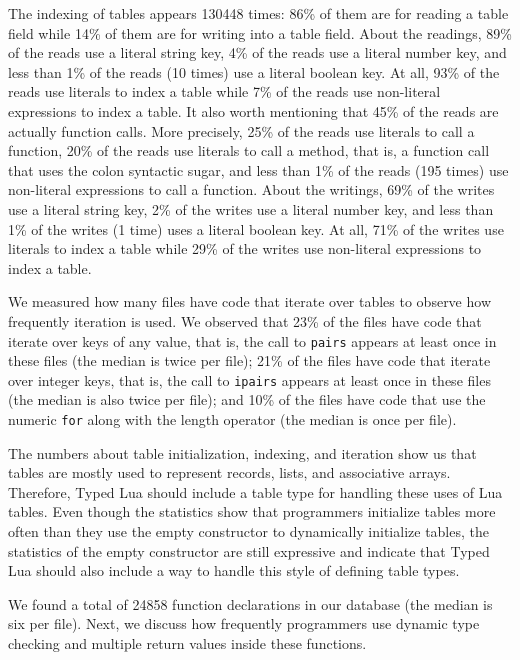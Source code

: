 \documentclass[preprint]{sig-alternate}
\begin{document}
The indexing of tables appears 130448 times:
86\% of them are for reading a table field while
14\% of them are for writing into a table field.
About the readings, 89\% of the reads use a literal string key,
4\% of the reads use a literal number key,
and less than 1\% of the reads (10 times) use a literal boolean key.
At all, 93\% of the reads use literals to index a table while
7\% of the reads use non-literal expressions to index a table.
It also worth mentioning that 45\% of the reads are actually
function calls.
More precisely, 25\% of the reads use literals to call a function,
20\% of the reads use literals to call a method, that is,
a function call that uses the colon syntactic sugar, 
and less than 1\% of the reads (195 times) use non-literal expressions
to call a function.
About the writings, 69\% of the writes use a literal string key,
2\% of the writes use a literal number key,
and less than 1\% of the writes (1 time) uses a literal boolean key.
At all, 71\% of the writes use literals to index a table while
29\% of the writes use non-literal expressions to index a table.

We measured how many files have code that iterate over tables to
observe how frequently iteration is used.
We observed that 23\% of the files have code that iterate over keys
of any value, that is, the call to \verb'pairs' appears at least once
in these files (the median is twice per file);
21\% of the files have code that iterate over integer keys, that is,
the call to \verb'ipairs' appears at least once in these files
(the median is also twice per file);
and 10\% of the files have code that use the numeric \verb'for'
along with the length operator (the median is once per file).

The numbers about table initialization, indexing, and iteration
show us that tables are mostly used to represent records, lists,
and associative arrays.
Therefore, Typed Lua should include a table type for handling
these uses of Lua tables.
Even though the statistics show that programmers initialize tables
more often than they use the empty constructor to
dynamically initialize tables, the statistics of the empty
constructor are still expressive and indicate that Typed Lua should
also include a way to handle this style of defining table types.

We found a total of 24858 function declarations in our database
(the median is six per file).
Next, we discuss how frequently programmers use dynamic type
checking and multiple return values inside these functions.
\end{document}
